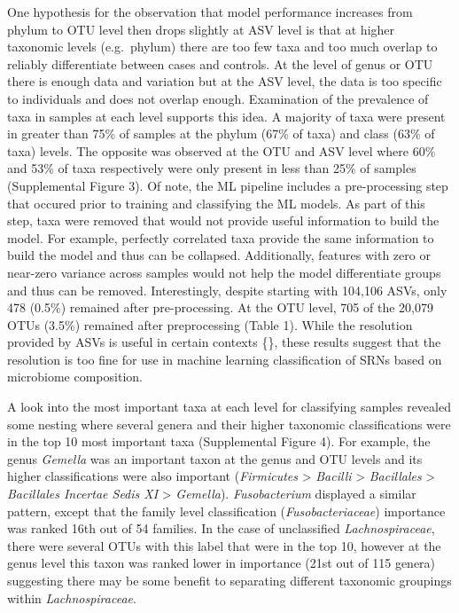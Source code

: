 \documentclass[
]{article}
\begin{document}
One hypothesis for the observation that model performance increases from
phylum to OTU level then drops slightly at ASV level is that at higher
taxonomic levels (e.g.~phylum) there are too few taxa and too much
overlap to reliably differentiate between cases and controls. At the
level of genus or OTU there is enough data and variation but at the ASV
level, the data is too specific to individuals and does not overlap
enough. Examination of the prevalence of taxa in samples at each level
supports this idea. A majority of taxa were present in greater than 75\%
of samples at the phylum (67\% of taxa) and class (63\% of taxa) levels.
The opposite was observed at the OTU and ASV level where 60\% and 53\%
of taxa respectively were only present in less than 25\% of samples
(Supplemental Figure 3). Of note, the ML pipeline includes a
pre-processing step that occured prior to training and classifying the
ML models. As part of this step, taxa were removed that would not
provide useful information to build the model. For example, perfectly
correlated taxa provide the same information to build the model and thus
can be collapsed. Additionally, features with zero or near-zero variance
across samples would not help the model differentiate groups and thus
can be removed. Interestingly, despite starting with 104,106 ASVs, only
478 (0.5\%) remained after pre-processing. At the OTU level, 705 of the
20,079 OTUs (3.5\%) remained after preprocessing (Table 1). While the
resolution provided by ASVs is useful in certain contexts \{\}, these
results suggest that the resolution is too fine for use in machine
learning classification of SRNs based on microbiome composition.

A look into the most important taxa at each level for classifying
samples revealed some nesting where several genera and their higher
taxonomic classifications were in the top 10 most important taxa
(Supplemental Figure 4). For example, the genus \emph{Gemella} was an
important taxon at the genus and OTU levels and its higher
classifications were also important (\emph{Firmicutes} \textgreater{}
\emph{Bacilli} \textgreater{} \emph{Bacillales} \textgreater{}
\emph{Bacillales Incertae Sedis XI} \textgreater{} \emph{Gemella}).
\emph{Fusobacterium} displayed a similar pattern, except that the family
level classification (\emph{Fusobacteriaceae}) importance was ranked
16th out of 54 families. In the case of unclassified
\emph{Lachnospiraceae}, there were several OTUs with this label that
were in the top 10, however at the genus level this taxon was ranked
lower in importance (21st out of 115 genera) suggesting there may be
some benefit to separating different taxonomic groupings within
\emph{Lachnospiraceae}.
\end{document}
